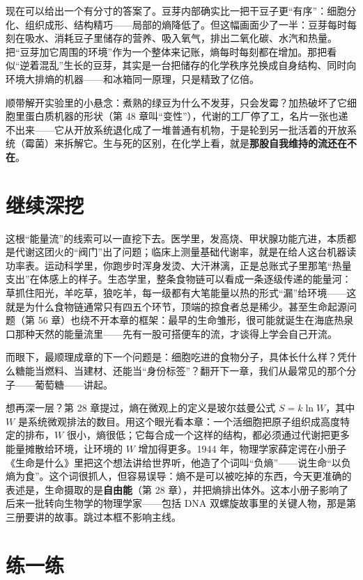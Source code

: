 现在可以给出一个有分寸的答案了。豆芽内部确实比一把干豆子更“有序”：细胞分化、组织成形、结构精巧——局部的熵降低了。但这幅画面少了一半：豆芽每时每刻在吸水、消耗豆子里储存的营养、吸入氧气，排出二氧化碳、水汽和热量。把“豆芽加它周围的环境”作为一个整体来记账，熵每时每刻都在增加。那把看似“逆着混乱”生长的豆芽，其实是一台把储存的化学秩序兑换成自身结构、同时向环境大排熵的机器——和冰箱同一原理，只是精致了亿倍。

顺带解开实验里的小悬念：煮熟的绿豆为什么不发芽，只会发霉？加热破坏了它细胞里蛋白质机器的形状（第 48 章叫“变性”），代谢的工厂停了工，名片一张也递不出来——它从开放系统退化成了一堆普通有机物，于是轮到另一批活着的开放系统（霉菌）来拆解它。生与死的区别，在化学上看，就是\textbf{那股自我维持的流还在不在}。

\section{继续深挖}

这根“能量流”的线索可以一直挖下去。医学里，发高烧、甲状腺功能亢进，本质都是代谢这团火的“阀门”出了问题；临床上测量基础代谢率，就是在给人这台机器读功率表。运动科学里，你跑步时浑身发烫、大汗淋漓，正是总账式子里那笔“热量支出”在体感上的样子。生态学里，整条食物链可以看成一条逐级传递的能量河：草抓住阳光，羊吃草，狼吃羊，每一级都有大笔能量以热的形式“漏”给环境——这就是为什么食物链通常只有四五个环节，顶端的掠食者总是稀少。甚至生命起源问题（第 56 章）也绕不开本章的框架：最早的生命雏形，很可能就诞生在海底热泉口那种天然的能量流里——先有一股可搭便车的流，才谈得上学会自己开流。

而眼下，最顺理成章的下一个问题是：细胞吃进的食物分子，具体长什么样？凭什么糖能当燃料、当建材、还能当“身份标签”？翻开下一章，我们从最常见的那个分子——葡萄糖——讲起。

\begin{tiaozhan}
想再深一层？第 28 章提过，熵在微观上的定义是玻尔兹曼公式 $S = k\ln W$，其中 $W$ 是系统微观排法的数目。用这个眼光看本章：一个活细胞把原子组织成高度特定的排布，$W$ 很小，熵很低；它每合成一个这样的结构，都必须通过代谢把更多能量摊散给环境，让环境的 $W$ 增加得更多。1944 年，物理学家薛定谔在小册子《生命是什么》里把这个想法讲给世界听，他造了个词叫“负熵”——说生命“以负熵为食”。这个词很抓人，但容易误导：熵不是可以被吃掉的东西，今天更准确的表述是，生命摄取的是\textbf{自由能}（第 28 章），并把熵排出体外。这本小册子影响了后来一批转向生物学的物理学家——包括 DNA 双螺旋故事里的关键人物，那是第三册要讲的故事。跳过本框不影响主线。
\end{tiaozhan}

\section*{练一练}

